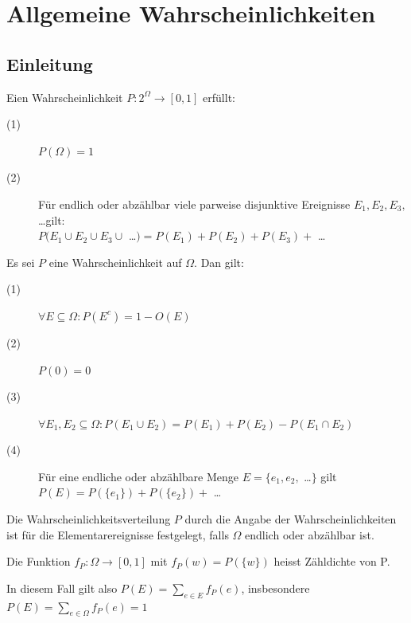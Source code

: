 \documentclass[10pt]{article}
\newtheorem[M]{definition}{Def.}
\newtheorem[M]{satz}{Satz}
\numberwithin{equation}{section}
\begin{document}
\newpage
\section{Allgemeine Wahrscheinlichkeiten}
\subsection{Einleitung}
\begin{definition}[Wahrscheinlichkeit]
Eien Wahrscheinlichkeit $P: 2^{\Omega} \rightarrow [0,1]$ erfüllt:
\begin{description}
	\item[(1)] $P(\Omega) = 1$
	\item[(2)] Für endlich oder abzählbar viele parweise disjunktive Ereignisse $E_1,E_2,E_3, $\dots gilt: \\
	 $P(E_1 \cup E_2 \cup E_3 \cup$ \dots $) = P(E_1) + P(E_2) + P(E_3) + $ \dots 
\end{description}
\end{definition}
\begin{satz}
Es sei $P$ eine Wahrscheinlichkeit auf $\Omega$. Dan gilt:
\begin{description}
	\item[(1)] $\forall E \subseteq \Omega : P(E^c)=1-O(E)$
	\item[(2)] $P(0) = 0$
	\item[(3)] $\forall E_1, E_2 \subseteq \Omega : P(E_1\cup E_2) = P(E_1) + P(E_2) - P(E_1 \cap E_2)$
	\item[(4)] Für eine endliche oder abzählbare Menge $E=\{e_1,e_2,$ \dots $\}$ gilt $P(E) = P(\{e_1\}) + P(\{e_2\}) +$ \dots
\end{description}
\end{satz}
Die Wahrscheinlichkeitsverteilung $P$ durch die Angabe der Wahrscheinlichkeiten ist für die Elementarereignisse festgelegt, falls $\Omega$ endlich oder abzählbar ist.
\begin{definition}
Die Funktion $f_P : \Omega \rightarrow [0,1]$ mit $f_P(w)=P(\{w\})$ heisst Zähldichte von P.
 \end{definition}
 In diesem Fall gilt also $P(E)=\sum_{e \in E} f_P(e)$, insbesondere $P(E)=\sum_{e \in \Omega} f_P(e)=1$
 
\end{document}

